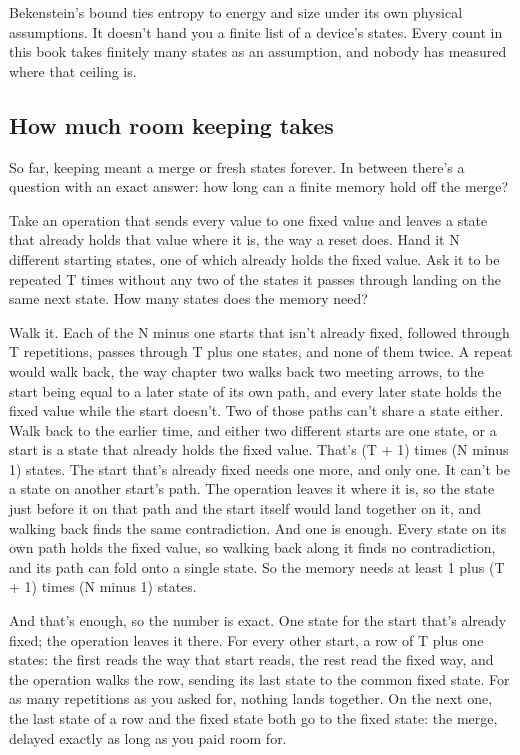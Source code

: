 \documentclass[11pt,twoside]{article}
\theoremstyle{thielethm}
\theoremstyle{thieledef}
\theoremstyle{thieledef}
\theoremstyle{thieledef}
\theoremstyle{thielethm}
\theoremstyle{thieleobs}
\theoremstyle{thielethm}
\begin{document}
Bekenstein's bound ties entropy to energy and size under its own physical assumptions. It doesn't hand you a finite list of a device's states. Every count in this book takes finitely many states as an assumption, and nobody has measured where that ceiling is.

\subsection{How much room keeping takes}

So far, keeping meant a merge or fresh states forever. In between there's a question with an exact answer: how long can a finite memory hold off the merge?

Take an operation that sends every value to one fixed value and leaves a state that already holds that value where it is, the way a reset does. Hand it N different starting states, one of which already holds the fixed value. Ask it to be repeated T times without any two of the states it passes through landing on the same next state. How many states does the memory need?

Walk it. Each of the N minus one starts that isn't already fixed, followed through T repetitions, passes through T plus one states, and none of them twice. A repeat would walk back, the way chapter two walks back two meeting arrows, to the start being equal to a later state of its own path, and every later state holds the fixed value while the start doesn't. Two of those paths can't share a state either. Walk back to the earlier time, and either two different starts are one state, or a start is a state that already holds the fixed value. That's (T + 1) times (N minus 1) states. The start that's already fixed needs one more, and only one. It can't be a state on another start's path. The operation leaves it where it is, so the state just before it on that path and the start itself would land together on it, and walking back finds the same contradiction. And one is enough. Every state on its own path holds the fixed value, so walking back along it finds no contradiction, and its path can fold onto a single state. So the memory needs at least 1 plus (T + 1) times (N minus 1) states.

And that's enough, so the number is exact. One state for the start that's already fixed; the operation leaves it there. For every other start, a row of T plus one states: the first reads the way that start reads, the rest read the fixed way, and the operation walks the row, sending its last state to the common fixed state. For as many repetitions as you asked for, nothing lands together. On the next one, the last state of a row and the fixed state both go to the fixed state: the merge, delayed exactly as long as you paid room for.
\end{document}
